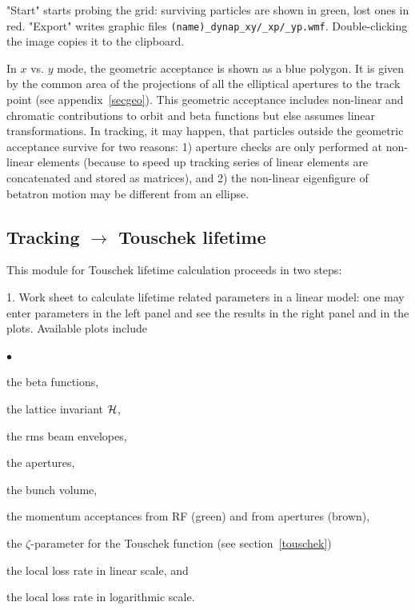 \documentclass[12pt]{article}
\newenvironment{mylist}
  {\begin{list}{$\bullet$}{\parsep 0pt}}
  {\end{list}}
\begin{document}
"Start" starts probing the grid: surviving particles are shown in green, lost ones in red.
"Export" writes graphic files {\tt (name)\_dynap\_xy/\_xp/\_yp.wmf}.
Double-clicking the image copies it to the clipboard.

In  $x$ vs. $y$ mode, the geometric acceptance is shown as a blue polygon. It is given by the common area of the projections of all the elliptical apertures to the track point (see appendix~\ref{secgeo}). This geometric acceptance includes non-linear and chromatic contributions to orbit and beta functions but else assumes linear transformations.
In tracking, it may happen, that particles outside the geometric acceptance survive for two reasons: 1) aperture checks are only performed at non-linear elements (because to speed up tracking series of linear elements are concatenated and stored as matrices), and 2) the non-linear eigenfigure of betatron motion may be different from an ellipse.



\subsection{\label{ssecttt}Tracking $\longrightarrow$ Touschek lifetime}
This module for Touschek lifetime calculation proceeds in two steps:

1. Work sheet to calculate lifetime related
parameters in a linear model: one may enter parameters in the
left panel and see the results in the right panel and in the plots.
Available plots include
\begin{mylist}
\item the beta functions,
\item the lattice invariant ${\cal H}$,
\item the rms beam envelopes,
\item the apertures,
\item the bunch volume,
\item the momentum acceptances from RF (green) and from apertures (brown),
\item the $\zeta$-parameter for the Touschek function (see section~\ref{touschek})
\item the local loss rate in linear scale, and
\item the local loss rate in logarithmic scale.
\end{mylist}
\end{document}
